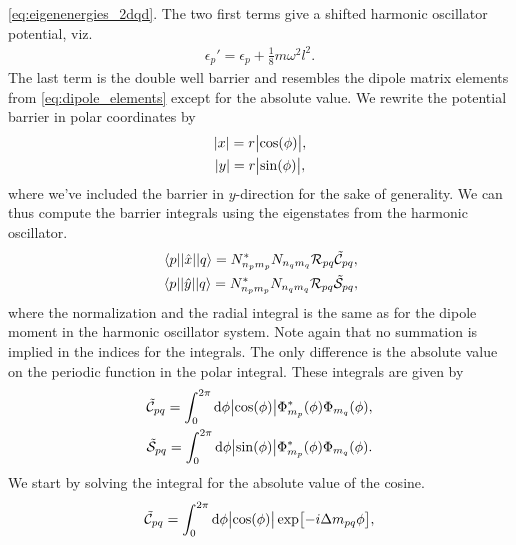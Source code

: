         \autoref{eq:eigenenergies_2dqd}.
        The two first terms give a shifted harmonic oscillator potential, viz.
        \begin{align}
            \epsilon_p' = \epsilon_p + \frac{1}{8} m \omega^2 l^2.
        \end{align}
        The last term is the double well barrier and resembles the dipole matrix
        elements from \autoref{eq:dipole_elements} except for the absolute
        value.
        We rewrite the potential barrier in polar coordinates by
        \begin{gather}
            \abs{x} = r\abs{\cos(\phi)}, \\
            \abs{y} = r\abs{\sin(\phi)},
        \end{gather}
        where we've included the barrier in $y$-direction for the sake of
        generality.
        We can thus compute the barrier integrals using the eigenstates from the
        harmonic oscillator.
        \begin{gather}
            \mel{p}{\abs{\position}}{q}
            =
            N^{*}_{n_p m_p} N_{n_q m_q}
            \mathcal{R}_{pq} \tilde{\mathcal{C}}_{pq},
            \\
            \mel{p}{\abs{\position[y]}}{q}
            =
            N^{*}_{n_p m_p} N_{n_q m_q}
            \mathcal{R}_{pq} \tilde{\mathcal{S}}_{pq},
        \end{gather}
        where the normalization and the radial integral is the same as for the
        dipole moment in the harmonic oscillator system.
        Note again that no summation is implied in the indices for the
        integrals.
        The only difference is the absolute value on the periodic function in
        the polar integral.
        These integrals are given by
        \begin{gather}
            \tilde{\mathcal{C}}_{pq}
            =
            \int_{0}^{2\pi} \dd \phi
            \abs{\cos(\phi)}
            \Phi^{*}_{m_p}(\phi)
            \Phi_{m_q}(\phi),
            \\
            \tilde{\mathcal{S}}_{pq}
            =
            \int_{0}^{2\pi} \dd \phi
            \abs{\sin(\phi)}
            \Phi^{*}_{m_p}(\phi)
            \Phi_{m_q}(\phi).
        \end{gather}
        We start by solving the integral for the absolute value of the cosine.
        \begin{align}
            \tilde{\mathcal{C}}_{pq}
            =
            \int_{0}^{2\pi} \dd \phi
            \abs{\cos(\phi)}
            \exp[-i\Delta m_{pq} \phi],
        \end{align}
